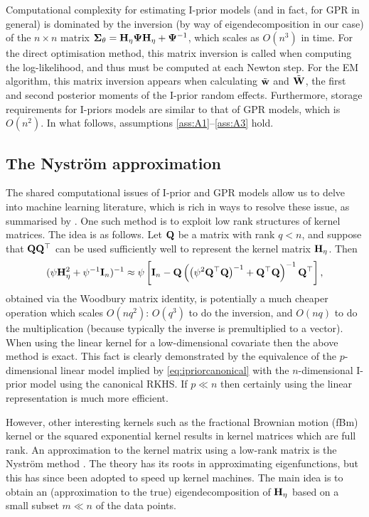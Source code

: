 Computational complexity for estimating I-prior models (and in fact, for GPR in general) is dominated by the inversion (by way of eigendecomposition in our case) of the $n \times n$ matrix ${\bm\Sigma}_\theta = {\mathbf H}_\eta{\bm\Psi}{\mathbf H}_\eta + {\bm\Psi}^{-1}$, which scales as $O(n^3)$ in time.
For the direct optimisation method, this matrix inversion is called when computing the log-likelihood, and thus must be computed at each Newton step.
For the EM algorithm, this matrix inversion appears when calculating $\tilde {{\mathbf w}}$ and $\tilde {{\mathbf W}}$, the first and second posterior moments of the I-prior random effects.
Furthermore, storage requirements for I-priors models are similar to that of GPR models, which is $O(n^2)$.
In what follows, assumptions \ref{ass:A1}--\ref{ass:A3} hold.

\subsection[The Nystrom approximation]{The Nyström approximation}

The shared computational issues of I-prior and GPR models allow us to delve into machine learning literature, which is rich in ways to resolve these issue, as summarised by \citet{quinonero2005unifying}.
One such method is to exploit low rank structures of kernel matrices.
The idea is as follows.
Let ${\mathbf Q}$ be a matrix with rank $q < n$, and suppose that ${\mathbf Q}{\mathbf Q}^\top$ can be used sufficiently well to represent the kernel matrix ${\mathbf H}_\eta$.
Then
%
\[
  (\psi{\mathbf H}_\eta^2 + \psi^{-1}{\mathbf I}_n)^{-1} \approx
  \psi\left[
  {\mathbf I}_n -
  {\mathbf Q}\left( \big(\psi^2{\mathbf Q}^\top{\mathbf Q}\big)^{-1} +{\mathbf Q}^\top{\mathbf Q} \right)^{-1} {\mathbf Q}^\top
  \right],
\]
%
obtained via the Woodbury matrix identity, is potentially a much cheaper operation which scales $O(nq^2)$: $O(q^3)$ to do the inversion, and $O(nq)$ to do the multiplication (because typically the inverse is premultiplied to a vector).
When using the linear kernel for a low-dimensional covariate then the above method is exact.
This fact is clearly demonstrated by the equivalence of the $p$-dimensional linear model implied by \eqref{eq:ipriorcanonical} with the $n$-dimensional I-prior model using the canonical RKHS.
If $p \ll n$ then certainly using the linear representation is much more efficient.

However, other interesting kernels such as the fractional Brownian motion (fBm) kernel or the squared exponential kernel results in kernel matrices which are full rank.
An approximation to the kernel matrix using a low-rank matrix is the Nystr\"om method \citep{williams2001using}.
The theory has its roots in approximating eigenfunctions, but this has since been adopted to speed up kernel machines.
The main idea is to obtain an (approximation to the true) eigendecomposition of ${\mathbf H}_\eta$ based on a small subset $m \ll n$ of the data points.

